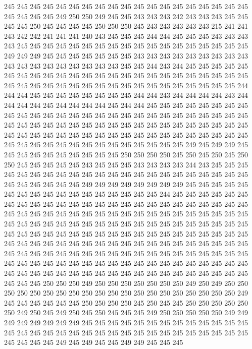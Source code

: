 245 245 245 245 245 245 245 245 245 245 245 245 245 245 245 245 245 245 245 245
245 245 245 249 250 250 249 245 245 243 243 243 242 243 243 243 245 245 245 245
250 245 245 245 245 250 250 250 245 243 243 243 243 243 215 241 241 243 242 242
241 241 241 240 243 245 245 245 244 244 245 245 245 243 243 243 243 245 245 245
245 245 245 245 245 245 245 245 245 245 245 245 245 245 245 249 249 249 245 245
245 245 245 245 245 243 243 243 243 243 243 243 243 243 243 243 243 243 243 243
243 243 243 245 245 244 243 244 245 245 245 245 245 245 245 245 245 245 245 245
245 245 245 245 245 245 245 245 245 245 245 245 245 245 245 245 245 245 245 245
245 245 245 245 245 245 245 245 245 245 244 244 244 245 245 245 245 245 245 245
245 244 244 243 244 244 244 244 243 244 244 244 244 245 244 244 244 244 245 244
244 245 245 245 245 245 245 245 245 245 245 245 245 245 245 245 245 245 245 245
245 245 245 245 245 245 245 245 245 245 245 245 245 245 245 245 245 245 245 245
245 245 245 245 245 245 245 245 245 245 245 245 245 245 245 245 245 245 245 245
245 245 245 245 245 245 245 245 245 245 245 245 245 245 245 245 245 245 245 245
249 245 249 249 245 245 245 245 245 245 245 245 245 245 250 250 250 250 245 250
245 250 245 250 250 245 245 245 245 245 243 245 245 245 243 243 243 243 244 243
245 245 245 245 245 245 245 245 245 245 245 245 245 245 245 245 245 245 245 245
245 245 245 245 245 245 245 245 249 249 249 249 249 249 249 249 245 245 245 245
245 245 245 245 245 245 245 245 245 245 245 245 245 244 245 245 245 245 245 245
245 245 245 245 245 245 245 245 245 245 245 245 245 245 245 245 245 245 245 245
245 245 245 245 245 245 245 245 245 245 245 245 245 245 245 245 245 245 245 245
245 245 245 245 245 245 245 245 245 245 245 245 245 245 245 245 245 245 245 245
245 245 245 245 245 245 245 245 245 245 245 245 245 245 245 245 245 245 245 245
245 245 245 245 245 245 245 245 245 245 245 245 245 245 245 245 245 245 245 245
245 245 245 245 245 245 245 245 245 245 245 245 245 245 245 245 245 245 245 245
245 245 245 245 245 245 245 245 245 245 245 245 245 245 245 245 245 245 245 245
245 245 245 245 245 245 245 245 245 245 245 245 245 245 245 250 250 250 249 250
250 250 250 250 250 250 249 250 249 250 250 250 250 250 250 250 250 250 250 250
250 250 250 250 250 250 250 250 250 249 245 245 245 245 245 245 250 250 250 250
245 250 245 245 250 250 250 250 250 250 249 250 245 249 250 245 250 245 245 245
249 250 250 250 250 250 249 249 249 249 249 249 249 249 245 245 245 245 245 245
245 245 245 245 245 245 245 245 245 245 245 245 245 245 245 245 245 245 245 245
245 245 245 245 245 245 245 245 245 245 249 245 249 245 245 249 249 245 245 245

